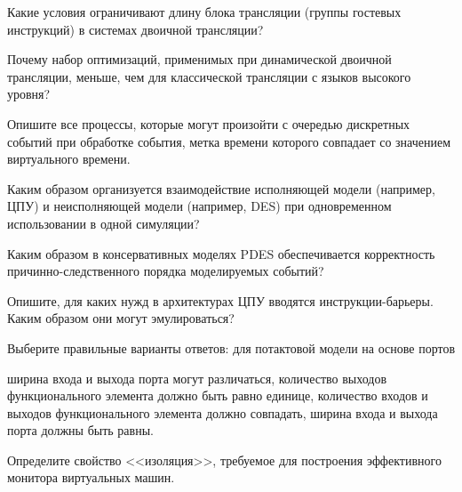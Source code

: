 \documentclass[a4paper, addpoints]{exam}
\begin{document}
\begin{questions}
\question[2] Какие условия ограничивают длину блока трансляции (группы гостевых инструкций) в системах двоичной трансляции?
\begin{solution}[2cm]
\end{solution}

\question[2] Почему набор оптимизаций, применимых при динамической двоичной трансляции, меньше, чем для классической трансляции с языков высокого уровня?
\begin{solution}[2cm]
\end{solution}

\question[2] Опишите все процессы, которые могут произойти с очередью дискретных событий при обработке события, метка времени которого совпадает со значением виртуального времени.
\begin{solution}[2cm]
\end{solution}


\question[2] Каким образом организуется взаимодействие исполняющей модели (например, ЦПУ) и неисполняющей модели (например, DES) при одновременном использовании в одной симуляции?
\begin{solution}[2cm]
\end{solution}

\question[2] Каким образом в консервативных моделях PDES обеспечивается корректность причинно-следственного порядка моделируемых событий?
\begin{solution}[2cm]
\end{solution}

\question[2] Опишите, для каких нужд в архитектурах ЦПУ вводятся инструкции-барьеры. Каким образом они могут эмулироваться?
\begin{solution}[2cm]
\end{solution}

\question[1] Выберите правильные варианты ответов: для потактовой модели на основе портов
\begin{choices}
    \choice ширина входа и выхода порта могут различаться,
    \choice количество выходов функционального элемента должно быть равно единице,
    \choice количество входов и выходов функционального элемента должно совпадать,
    \correctchoice ширина входа и выхода порта должны быть равны.
\end{choices}

\question[2] Определите свойство <<изоляция>>, требуемое для построения эффективного монитора виртуальных машин.
\begin{solution}[2cm]
\end{solution}


\end{questions}
\end{document}
